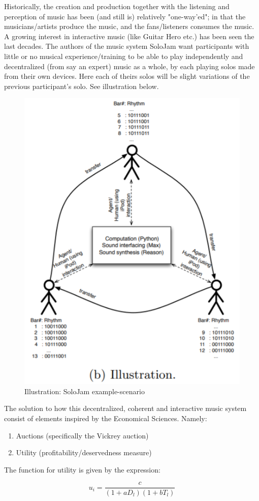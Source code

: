 \documentclass{article}
\begin{document}
Historically, the creation and production together with the listening and perception of music has been (and still is) relatively "one-way'ed"; in that the musicians/artists produce the music, and the fans/listeners consumes the music. A growing interest in interactive music (like Guitar Hero etc.) has been seen the last decades. The authors of the music system SoloJam \cite{SoloJam} want participants with little or no musical experience/training to be able to play independently and decentralized (from say an expert) music as a whole, by each playing solos made from their own devices. Here each of theirs solos will be slight variations of the previous participant's solo. See illustration below.

\begin{figure}[!htp]
\centering
\includegraphics[width=0.52\columnwidth]{Assets/pics/solojam_illustration.PNG}
\caption{Illustration: SoloJam example-scenario}
\label{fig:solojam}
\end{figure}

The solution to how this decentralized, coherent and interactive music system consist of elements inspired by the Economical Sciences. Namely:

\begin{enumerate}
    \item Auctions (specifically the Vickrey auction)
    \item Utility (profitability/deservedness measure)
\end{enumerate}

The function for utility is given by the expression:

\begin{equation}
u_i = \frac{c}{(1+a D_l)(1+b T_l)}
\end{equation}
\newline
\end{document}
